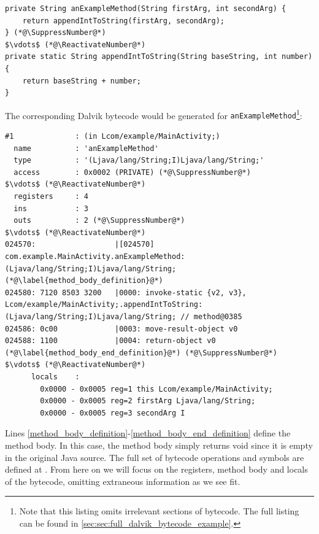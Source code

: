 \begin{lstlisting}[mathescape, numberblanklines=false]
private String anExampleMethod(String firstArg, int secondArg) {
    return appendIntToString(firstArg, secondArg);
} (*@\SuppressNumber@*)
$\vdots$ (*@\ReactivateNumber@*)
private static String appendIntToString(String baseString, int number) {
    return baseString + number;
}
\end{lstlisting}

The corresponding Dalvik bytecode would be generated for {\tt anExampleMethod}\footnote{Note that this listing omits irrelevant
sections of bytecode. The full listing can be found in
\autoref{sec:sec:full_dalvik_bytecode_example}.}:

\begin{lstlisting}[mathescape,numberblanklines=false]
#1              : (in Lcom/example/MainActivity;)
  name          : 'anExampleMethod'
  type          : '(Ljava/lang/String;I)Ljava/lang/String;'
  access        : 0x0002 (PRIVATE) (*@\SuppressNumber@*)
$\vdots$ (*@\ReactivateNumber@*)
  registers     : 4
  ins           : 3
  outs          : 2 (*@\SuppressNumber@*)
$\vdots$ (*@\ReactivateNumber@*)
024570:                  |[024570] com.example.MainActivity.anExampleMethod:(Ljava/lang/String;I)Ljava/lang/String; (*@\label{method_body_definition}@*)
024580: 7120 8503 3200   |0000: invoke-static {v2, v3}, Lcom/example/MainActivity;.appendIntToString:(Ljava/lang/String;I)Ljava/lang/String; // method@0385
024586: 0c00             |0003: move-result-object v0
024588: 1100             |0004: return-object v0 (*@\label{method_body_end_definition}@*) (*@\SuppressNumber@*)
$\vdots$ (*@\ReactivateNumber@*)
      locals    :
        0x0000 - 0x0005 reg=1 this Lcom/example/MainActivity;
        0x0000 - 0x0005 reg=2 firstArg Ljava/lang/String;
        0x0000 - 0x0005 reg=3 secondArg I
\end{lstlisting}

Lines \ref{method_body_definition}-\ref{method_body_end_definition} define the
method body. In this case, the method body simply returns void since it is empty
in the original Java source. The full set of bytecode operations and symbols are
defined at \cite{dalvikBytecode}. From here on we will focus on the
registers, method body and locals of the bytecode, omitting extraneous
information as we see fit.

